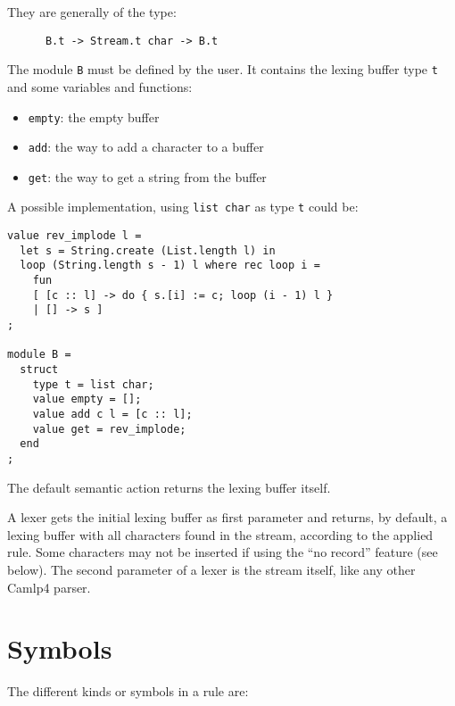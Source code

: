 \documentclass[11pt]{article}
\begin{document}
They are generally of the type:

\begin{verbatim}
      B.t -> Stream.t char -> B.t
\end{verbatim}

The module \verb/B/ must be defined by the user. It contains the
lexing buffer type \verb/t/ and some variables and functions:

\begin{itemize}
\item \verb/empty/: the empty buffer
\item \verb/add/: the way to add a character to a buffer
\item \verb/get/: the way to get a string from the buffer
\end{itemize}

A possible implementation, using \verb/list char/ as type \verb/t/ could be:

\begin{verbatim}
value rev_implode l =
  let s = String.create (List.length l) in
  loop (String.length s - 1) l where rec loop i =
    fun
    [ [c :: l] -> do { s.[i] := c; loop (i - 1) l }
    | [] -> s ]
;

module B =
  struct
    type t = list char;
    value empty = [];
    value add c l = [c :: l];
    value get = rev_implode;
  end
;
\end{verbatim}

The default semantic action returns the lexing buffer itself.

A lexer gets the initial lexing buffer as first parameter and returns,
by default, a lexing buffer with all characters found in the stream,
according to the applied rule. Some characters may not be inserted if
using the ``no record'' feature (see below). The second parameter of
a lexer is the stream itself, like any other Camlp4 parser.

\section{Symbols}

The different kinds or symbols in a rule are:
\end{document}

